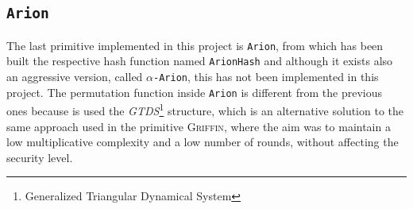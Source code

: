 \documentclass[12pt, a4paper]{report}
\begin{document}
\subsection{\texttt{Arion}}\label{subsec:arion}

The last primitive implemented in this project is \texttt{Arion}, from which has been built the respective hash function named \texttt{ArionHash} and although it exists also an aggressive version, called \texttt{$\alpha$-Arion}, this has not been implemented in this project.
The permutation function inside \texttt{Arion} is different from the previous ones because is used the \textit{GTDS}\footnote{Generalized Triangular Dynamical System} structure, which is an alternative solution to the same approach used in the primitive \textsc{Griffin}, where the aim was to maintain a low multiplicative complexity and a low number of rounds, without affecting the security level.
\end{document}
